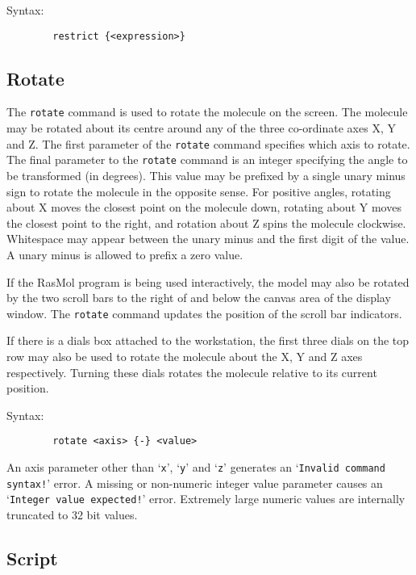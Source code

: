 Syntax:
\begin{verbatim}
        restrict {<expression>}
\end{verbatim}


\subsection{Rotate}
\label{CRotate}
The {\tt rotate} command is used to rotate the molecule on the screen. The
molecule may be rotated about its centre around any of the three co-ordinate
axes X, Y and Z. The first parameter of the {\tt rotate} command specifies
which axis to rotate. The final parameter to the {\tt rotate} command is an
integer specifying the angle to be transformed (in degrees). This value may 
be prefixed by a single unary minus sign to rotate the molecule in the 
opposite sense. For positive angles, rotating about X moves the closest 
point on the molecule down, rotating about Y moves the closest point to the 
right, and rotation about Z spins the molecule clockwise. Whitespace may 
appear between the unary minus and the first digit of the value. A unary 
minus is allowed to prefix a zero value.

If the RasMol program is being used interactively, the model may also be
rotated by the two scroll bars to the right of and below the canvas area of
the display window. The {\tt rotate} command updates the position of the
scroll bar indicators.

If there is a dials box attached to the workstation, the first three dials
on the top row may also be used to rotate the molecule about the X, Y and
Z axes respectively. Turning these dials rotates the molecule relative to
its current position.

Syntax:
\begin{verbatim}
        rotate <axis> {-} <value>
\end{verbatim}

An axis parameter other than `{\tt x}', `{\tt y}' and `{\tt z}' generates
an `{\tt Invalid command syntax!}' error. A missing or non-numeric integer
value parameter causes an `{\tt Integer value expected!}' error. Extremely
large numeric values are internally truncated to 32 bit values.


\subsection{Script}
\label{CScript}

